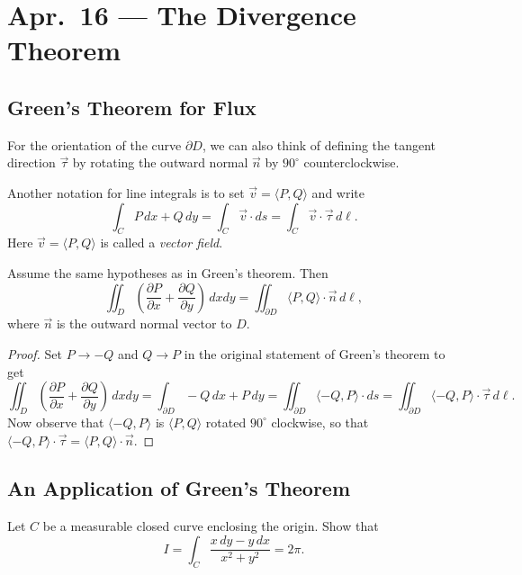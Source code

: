 \chapter{Apr.~16 --- The Divergence Theorem}

\section{Green's Theorem for Flux}

\begin{remark}
  For the orientation of the curve $\partial D$, we
  can also think of defining the tangent direction
  $\vec{\tau}$ by rotating the outward normal $\vec{n}$
  by $90^\circ$ counterclockwise.
\end{remark}

\begin{remark}
  Another notation for line integrals is to set
  $\vec{v} = \langle P, Q \rangle$ and write
  \[
    \int_{C} P\, dx + Q\, dy
    = \int_{C} \vec{v} \cdot ds
    = \int_{C} \vec{v} \cdot \vec{\tau}\, d\ell.
  \]
  Here $\vec{v} = \langle P, Q \rangle$ is called a
  \emph{vector field}.
\end{remark}

\begin{corollary}
  Assume the same hypotheses as in Green's theorem.
  Then
  \[
    \iint_D \left( \frac{\partial P}{\partial x} + \frac{\partial Q}{\partial y} \right) \, dxdy
    = \iint_{\partial D} \langle P, Q \rangle \cdot \vec{n}\, d\ell,
  \]
  where $\vec{n}$ is the outward normal vector to $D$.
\end{corollary}

\begin{proof}
  Set $P \to -Q$ and $Q \to P$ in the original
  statement of Green's theorem to get
  \[
    \iint_D \left( \frac{\partial P}{\partial x} + \frac{\partial Q}{\partial y} \right) \, dxdy = \int_{\partial D} -Q\, dx + P\, dy
    = \iint_{\partial D} \langle -Q, P \rangle \cdot ds
    = \iint_{\partial D} \langle -Q, P \rangle \cdot \vec{\tau}\, d\ell.
  \]
  Now observe that $\langle -Q, P \rangle$ is $\langle P, Q \rangle$
  rotated $90^\circ$ clockwise, so that
  $\langle -Q, P \rangle \cdot \vec{\tau} = \langle P, Q \rangle \cdot \vec{n}$.
\end{proof}

\section{An Application of Green's Theorem}
\begin{example}
  Let $C$ be a measurable closed curve enclosing the
  origin. Show that
  \[
    I = \int_C \frac{x\, dy - y\, dx}{x^2 + y^2} = 2\pi.
  \]
\end{example}

